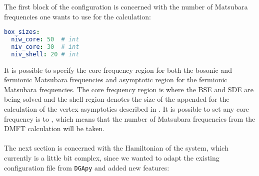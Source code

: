 \documentclass[../../main.tex]{subfiles}
\begin{document}
The first block of the configuration is concerned with the number of Matsubara frequencies one wants to use for the calculation:

\begin{minipage}{\textwidth}%
\begin{lstlisting}[language=yaml]
box_sizes:
  niw_core: 50  # int
  niv_core: 30  # int
  niv_shell: 20 # int
\end{lstlisting}
\end{minipage}
It is possible to specify the core frequency region for both the bosonic and fermionic Matsubara frequencies and asymptotic region for the fermionic Matsubara frequencies. The core frequency region is where the BSE and SDE are being solved and the shell region denotes the size of the appended  for the calculation of the vertex asymptotics described in . It is possible to set any core frequency is to , which means that the number of Matsubara frequencies from the DMFT calculation will be taken.
\\\\
The next section is concerned with the Hamiltonian of the system, which currently is a little bit complex, since we wanted to adapt the existing configuration file from \texttt{DGApy} and added new features:
\end{document}
